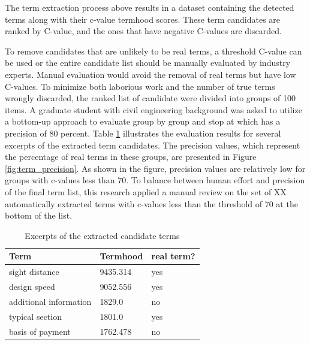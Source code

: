 \documentclass[Journal,InsideFigs, DoubleSpace]{ascelike} %
\begin{document}
%
\par
The term extraction process above results in a dataset containing the detected terms along with their c-value termhood scores. These term candidates are ranked by C-value, and the ones that have negative C-values are discarded. %
\par
To remove candidates that are unlikely to be real terms, a threshold C-value can be used or the entire candidate list should be manually evaluated by industry experts. Manual evaluation would avoid the removal of real terms but have low C-values. To minimize both laborious work and the number of true terms wrongly discarded, the ranked list of candidate were divided into groups of 100 items. A graduate student with civil engineering background was asked to utilize a bottom-up approach to evaluate group by group and stop at which has a precision of 80 percent. Table \ref{table:term_evaluation} illustrates the evaluation results for several excerpts of the extracted term candidates. The precision values, which represent the percentage of real terms in these groups, are presented in Figure \ref{fig:term_precision}. As shown in the figure, precision values are relatively low for groups with c-values less than 70. To balance between human effort and precision of the final term list, this research applied a manual review on the set of XX automatically extracted terms with c-values less than the threshold of 70 at the bottom of the list.
%
\begin{table} [t]
	\caption{Excerpts of the extracted candidate terms}
	\label{table:term_evaluation}
	\centering
	\small
	\renewcommand{\arraystretch}{1.25}
	\begin{tabular}{l l l}
		\hline
		\textbf{Term} & \textbf{Termhood} & \textbf{real term?}\\
		\hline
		sight distance		& 9435.314 & yes\\
		design speed & 9052.556 & yes \\
		additional information & 1829.0 & no\\
		typical section & 1801.0  & yes\\
		basis of payment & 1762.478 & no\\
		\hline
	\end{tabular}
	
	\normalsize
\end{table}
\end{document}
